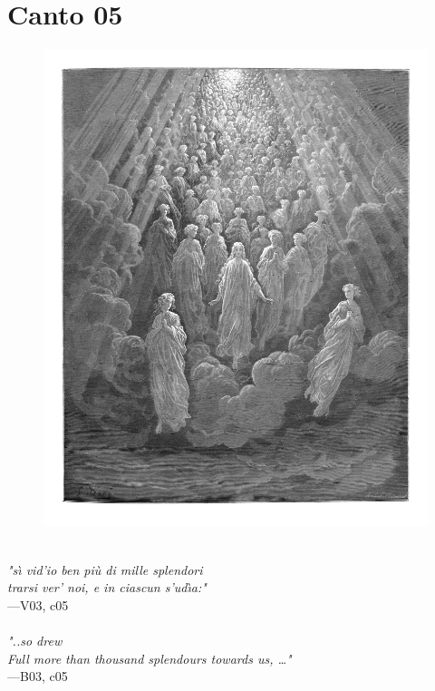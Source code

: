\documentclass[../Dore_vision.tex]{subfiles}
\begin{document}
\newpage

\section{Canto 05}

\begin{figure}[ht]
\centering
\includegraphics[height=\figsize]{illustrations/book_3/V03, c05.jpg}
\end{figure}

\begin{center}
\begin{minipage}{0.8\linewidth}
\textit{\\
"s\`{\i} vid’io ben più di mille splendori\\trarsi ver’ noi, e in ciascun s’ud\`{\i}a:"} \\
—V03, c05 \\~\\
\textit{"..so drew\\Full more than thousand splendours towards us, …"} \\
—B03, c05
\end{minipage}
\end{center}
\end{document}

